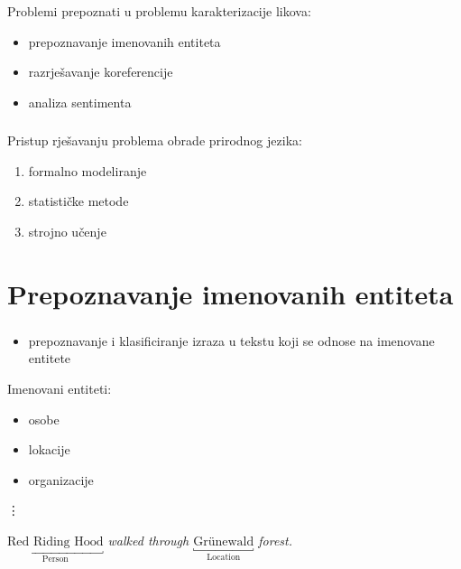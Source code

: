 \documentclass[t, xcolor={usenames,dvipsnames,svgnames,table}]{beamer}
\begin{document}
	\begin{frame}
		\frametitle{\secname}
		
		Problemi prepoznati u problemu karakterizacije likova:
		\begin{itemize}
			\item	prepoznavanje imenovanih entiteta
			\item	razrješavanje koreferencije
			\item 	analiza sentimenta
		\end{itemize}
	\end{frame}
	
	\begin{frame}
		\frametitle{\secname}

		Pristup rješavanju problema obrade prirodnog jezika:
		\begin{enumerate}
			\item	formalno modeliranje
			\item 	statističke metode
			\item 	strojno učenje
		\end{enumerate}
	\end{frame}


\section{Prepoznavanje imenovanih entiteta}
	
	\begin{frame}
		\sectionpage
	\end{frame}

	\begin{frame}
		\frametitle{\secname}
		
		\begin{itemize}
			\item 	prepoznavanje i klasificiranje izraza u tekstu koji se odnose na imenovane entitete
		\end{itemize}
		
		\medskip
		Imenovani entiteti:
		\begin{itemize}
			\item	osobe
			\item	lokacije
			\item 	organizacije
		\end{itemize}	
		\hspace{0.8em} \vdots
		
		\medskip
		
		\begin{displayquote}
			\textit{$\underbracket{\text{Red Riding Hood}}_{\text{Person}}$ walked through $\underbracket{\text{Grünewald}}_{\text{Location}}$ forest.}
		\end{displayquote}
		
		
	\end{frame}
	
\end{document}
